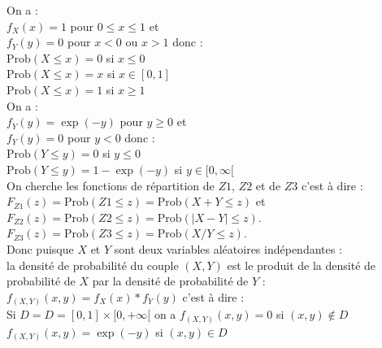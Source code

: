 \documentclass[a4paper,11pt]{book}
\begin{document}
\begin{enumerate}
On a :\\
$f_X(x)=1$ pour $0\leq x \leq 1$ et\\
$f_Y(y)=0$ pour $x<0$ ou $x>1$
donc :\\
$\mbox{Prob}(X\leq x)=0$ si $x\leq 0$\\
$\mbox{Prob}(X\leq x)=x$ si $x\in[0,1]$\\
$\mbox{Prob}(X\leq x)=1$ si $x\geq 1$\\
On a :\\
$f_Y(y)=\exp(-y)$ pour $y\geq 0$ et\\
$f_Y(y)=0$ pour $y<0$
donc :\\
$\mbox{Prob}(Y\leq y)=0$ si $y\leq 0$\\
$\mbox{Prob}(Y\leq y)=1-\exp(-y)$ si $y\in[0,\infty[$\\

On cherche les fonctions de r\'epartition de $Z1$, $Z2$ et de $Z3$ c'est \`a 
dire :\\
$F_{Z1}(z)=\mbox{Prob}(Z1\leq z)=\mbox{Prob}(X+Y\leq z)$ et\\
$F_{Z2}(z)=\mbox{Prob}(Z2\leq z)=\mbox{Prob}(|X-Y|\leq z)$.\\
$F_{Z3}(z)=\mbox{Prob}(Z3\leq z)=\mbox{Prob}(X/Y\leq z)$.\\

Donc puisque $X$ et $Y$ sont deux variables al\'eatoires ind\'ependantes :\\
la densit\'e de probabilit\'e du couple $(X,Y)$ est le produit de la
densit\'e de probabilit\'e de $X$ par la densit\'e de probabilit\'e de $Y$ :\\
$f_{(X,Y)}(x,y)=f_X(x)*f_Y(y)$ c'est \`a dire :\\
Si $D=D=[0,1]\times [0,+\infty[$ on a 
$f_{(X,Y)}(x,y)=0$ si $(x,y) \notin D$\\
$f_{(X,Y)}(x,y)=\exp(-y)$ si $(x,y) \in D$ \\



\end{enumerate}
\end{document}
